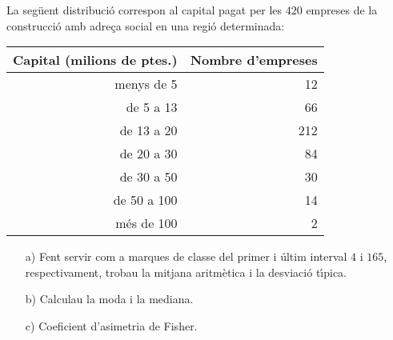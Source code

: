 \begin{prob}
{
La seg\"uent distribuci\'o correspon al capital 
pagat per les $420$ empreses de la construcci\'o 
 amb adre\c{c}a social en una regi\'o 
determinada:
\begin{center}
\begin{tabular}{|r|r|}
\hline
Capital (milions de ptes.) & Nombre d'empreses\\\hline\hline
menys de 5 & 12 \\\hline
de 5 a 13 & 66 \\\hline
de 13 a 20 & 212 \\\hline
de 20 a 30 & 84 \\\hline
de 30 a 50 & 30 \\\hline
de 50 a 100 & 14 \\\hline
m\'es de 100 & 2 \\\hline
\end{tabular}
\end{center}
\begin{itemize}
\item[a)] {Fent servir com a marques de classe 
del primer i \'ultim interval $4$ i
$165$, respectivament, trobau la mitjana 
aritm\`etica i la 
desviaci\'o t\'{\i}pica.}
\item[b)] {Calculau la moda i la mediana.}
\item[c)] {Coeficient d'asimetria de Fisher.
}
\end{itemize}
}
\end{prob}

